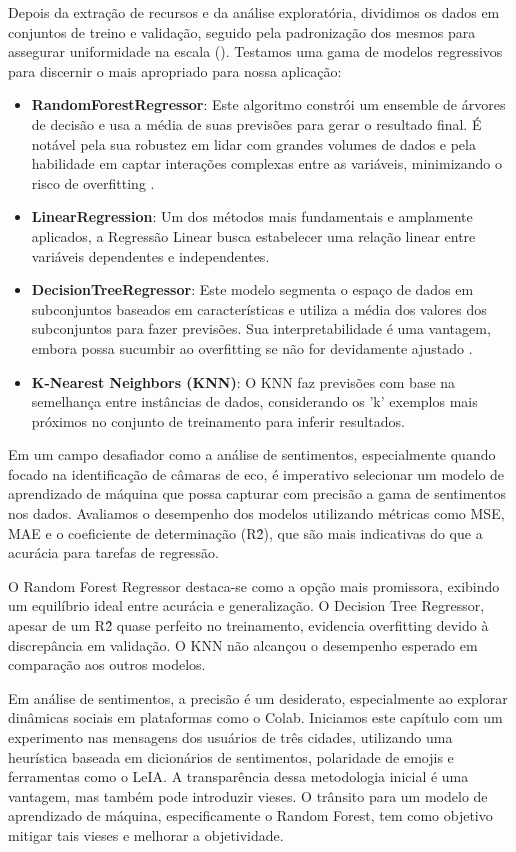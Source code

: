 Depois da extração de recursos e da análise exploratória, dividimos os dados em conjuntos de treino e validação, seguido pela padronização dos mesmos para assegurar uniformidade na escala (\cite{2000_Jain}). Testamos uma gama de modelos regressivos para discernir o mais apropriado para nossa aplicação:

\begin{itemize}
\item \textbf{RandomForestRegressor}: Este algoritmo constrói um ensemble de árvores de decisão e usa a média de suas previsões para gerar o resultado final. É notável pela sua robustez em lidar com grandes volumes de dados e pela habilidade em captar interações complexas entre as variáveis, minimizando o risco de overfitting \cite[5-32]{2001_Breiman}.
\item \textbf{LinearRegression}: Um dos métodos mais fundamentais e amplamente aplicados, a Regressão Linear busca estabelecer uma relação linear entre variáveis dependentes e independentes.
\item \textbf{DecisionTreeRegressor}: Este modelo segmenta o espaço de dados em subconjuntos baseados em características e utiliza a média dos valores dos subconjuntos para fazer previsões. Sua interpretabilidade é uma vantagem, embora possa sucumbir ao overfitting se não for devidamente ajustado \cite[81-106]{1986_Quinlan}.
\item \textbf{K-Nearest Neighbors (KNN)}: O KNN faz previsões com base na semelhança entre instâncias de dados, considerando os 'k' exemplos mais próximos no conjunto de treinamento para inferir resultados.
\end{itemize}

Em um campo desafiador como a análise de sentimentos, especialmente quando focado na identificação de câmaras de eco, é imperativo selecionar um modelo de aprendizado de máquina que possa capturar com precisão a gama de sentimentos nos dados. Avaliamos o desempenho dos modelos utilizando métricas como MSE, MAE e o coeficiente de determinação (R\^2), que são mais indicativas do que a acurácia para tarefas de regressão.

O Random Forest Regressor destaca-se como a opção mais promissora, exibindo um equilíbrio ideal entre acurácia e generalização. O Decision Tree Regressor, apesar de um R\^2 quase perfeito no treinamento, evidencia overfitting devido à discrepância em validação. O KNN não alcançou o desempenho esperado em comparação aos outros modelos.

Em análise de sentimentos, a precisão é um desiderato, especialmente ao explorar dinâmicas sociais em plataformas como o Colab. Iniciamos este capítulo com um experimento nas mensagens dos usuários de três cidades, utilizando uma heurística baseada em dicionários de sentimentos, polaridade de emojis e ferramentas como o LeIA. A transparência dessa metodologia inicial é uma vantagem, mas também pode introduzir vieses. O trânsito para um modelo de aprendizado de máquina, especificamente o Random Forest, tem como objetivo mitigar tais vieses e melhorar a objetividade.

